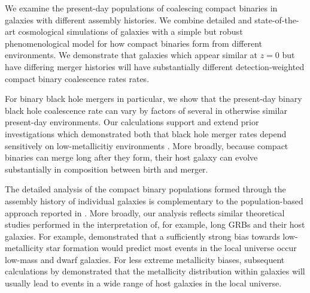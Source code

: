 \documentclass[nofootinbib,twocolumn,prd]{emulateapj}
\newcommand\jillianremark[1]{{\color{blue}#1}}
\begin{document}
We examine the present-day populations of coalescing compact binaries in galaxies with different assembly histories.  We
combine  detailed and state-of-the-art cosmological simulations of galaxies with a simple but robust phenomenological
model for how compact binaries form from different environments.   
 We demonstrate that
galaxies which appear similar at $z = 0$ but have differing merger histories will have substantially different
detection-weighted compact binary
coalescence rates rates.   


For binary black hole mergers in particular, we show that the present-day binary black hole coalescence rate can vary by factors of several in otherwise
similar present-day environments.   Our calculations support and extend prior investigations which demonstrated both
that black hole merger rates depend sensitively on low-metallicitiy environments
\citep[see,e.g.][]{PSellipticals,popsyn-LowMetallicityImpact2b-StarTrackRevised-2013,gwastro-EventPopsynPaper-2016}.   More broadly,
because compact binaries can merge long after they form, their host galaxy can evolve substantially in composition
between birth and merger.

The detailed analysis of the compact binary populations formed through the assembly history of individual galaxies is
complementary to the  population-based approach reported in
\cite{2016arXiv160508783L}.     More broadly, our analysis reflects  similar theoretical studies performed in the interpretation of, for
example, long GRBs and their host galaxies. 
For example, \cite{2009ApJ...702..377K} demonstrated that a sufficiently strong bias towards low-metallicity star formation would predict
most  events in the local universe occur low-mass and dwarf galaxies.
For less extreme metallicity biases, subsequent calculations by  \citet{2011MNRAS.417..567N} demonstrated that the
metallicity distribution within galaxies will usually lead to events in a wide range of host galaxies in the local universe.
\end{document}
